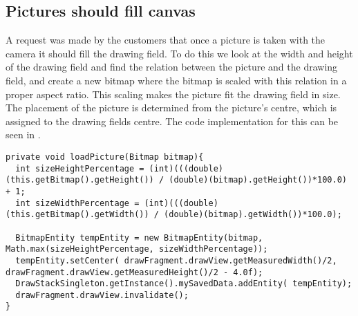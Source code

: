 \subsection{Pictures should fill canvas}
A request was made by the customers that once a picture is taken with the camera it should fill the drawing field.
To do this we look at the width and height of the drawing field and find the relation between the picture and the drawing field, and create a new bitmap where the bitmap is scaled with this relation in a proper aspect ratio.
This scaling makes the picture fit the drawing field in size.
The placement of the picture is determined from the picture's centre, which is assigned to the drawing fields centre.
The code implementation for this can be seen in .

\begin{lstlisting}[caption={Method which scales the picture},label=lst:loadPicture]
private void loadPicture(Bitmap bitmap){
  int sizeHeightPercentage = (int)(((double)(this.getBitmap().getHeight()) / (double)(bitmap).getHeight())*100.0) + 1;
  int sizeWidthPercentage = (int)(((double)(this.getBitmap().getWidth()) / (double)(bitmap).getWidth())*100.0);

  BitmapEntity tempEntity = new BitmapEntity(bitmap, Math.max(sizeHeightPercentage, sizeWidthPercentage));
  tempEntity.setCenter( drawFragment.drawView.getMeasuredWidth()/2, drawFragment.drawView.getMeasuredHeight()/2 - 4.0f);
  DrawStackSingleton.getInstance().mySavedData.addEntity( tempEntity);
  drawFragment.drawView.invalidate();
}
\end{lstlisting}